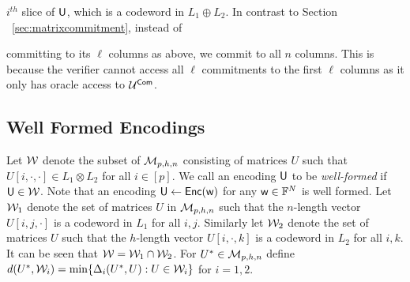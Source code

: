 $i^{th}$ slice of $\mathsf{U}$, which is a codeword in $L_1\oplus L_2$. In contrast
to Section ~\ref{sec:matrixcommitment}, instead of

committing to its $\ell$ columns as above, we commit to all $n$ columns. This is
because the verifier cannot access all $\ell$ commitments to the first $\ell$ columns
 as it only has oracle access to $\mathcal{U}^{\mathsf{Com}}$. 

\subsection{Well Formed Encodings}\label{sec:wellformedenc}
Let $\mathcal{W}$ denote the subset of $\mathcal{M}_{p,h,n}$
consisting of matrices $U$ such that $U[i,\cdot,\cdot]\in L_1\otimes L_2$ for all $i\in [p]$. 
We call an encoding $\mathsf{U}$ to be {\em well-formed} if $\mathsf{U}\in \mathcal{W}$. Note
that an encoding $\mathsf{U}\gets \mathsf{Enc}(\mathsf{w})$ for any $\mathsf{w}\in \mathbb{F}^N$ is well formed. 
Let $\mathcal{W}_1$ denote the set of matrices
$U$ in $\mathcal{M}_{p,h,n}$ such that the $n$-length vector $U[i,j,\cdot]$ is a
codeword in $L_1$ for all $i,j$. Similarly let $\mathcal{W}_2$ denote the set of
matrices $U$ such that the $h$-length vector $U[i,\cdot,k]$ is a codeword in
$L_2$ for all $i,k$. It can be seen that $\mathcal{W}=\mathcal{W}_1\cap \mathcal{W}_2$. For $U^\ast\in \mathcal{M}_{p,h,n}$ define
$d(U^\ast,\mathcal{W}_i)=\min\{\Delta_i(U^\ast,U):U\in \mathcal{W}_i\}$ for $i=1,2$.

